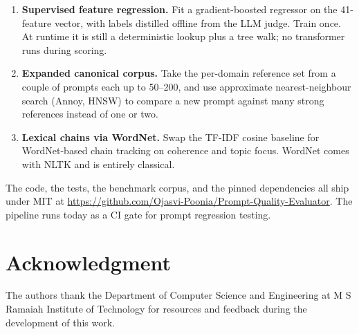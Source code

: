 \documentclass[conference]{IEEEtran}
\begin{document}
\begin{enumerate}
\item \textbf{Supervised feature regression.} Fit a gradient-boosted regressor on the 41-feature vector, with labels distilled offline from the LLM judge. Train once. At runtime it is still a deterministic lookup plus a tree walk; no transformer runs during scoring.
\item \textbf{Expanded canonical corpus.} Take the per-domain reference set from a couple of prompts each up to 50--200, and use approximate nearest-neighbour search (Annoy, HNSW) to compare a new prompt against many strong references instead of one or two.
\item \textbf{Lexical chains via WordNet.} Swap the TF-IDF cosine baseline for WordNet-based chain tracking on coherence and topic focus. WordNet comes with NLTK and is entirely classical.
\end{enumerate}

The code, the tests, the benchmark corpus, and the pinned dependencies all ship under MIT at \url{https://github.com/Ojasvi-Poonia/Prompt-Quality-Evaluator}. The pipeline runs today as a CI gate for prompt regression testing.

\section*{Acknowledgment}
The authors thank the Department of Computer Science and Engineering at M S Ramaiah Institute of Technology for resources and feedback during the development of this work.
\end{document}
